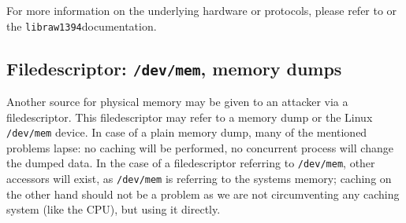 For more information on the underlying hardware or protocols, please refer to
\cite{OHCIspecs:2000,fwire_sys_arch:2222} or the
\texttt{libraw1394}\footnotemark[\value{footnote}] documentation.





\subsection{Filedescriptor: \texttt{/dev/mem}, memory dumps}

Another source for physical memory may be given to an attacker via a
filedescriptor. This filedescriptor may refer to a memory dump or the Linux
\texttt{/dev/mem} device. In case of a plain memory dump, many of the mentioned
problems lapse: no caching will be performed, no concurrent process will change
the dumped data. In the case of a filedescriptor referring to \texttt{/dev/mem},
other accessors will exist, as \texttt{/dev/mem} is referring to the systems
memory; caching on the other hand should not be a problem as we are not
circumventing any caching system (like the CPU), but using it directly.



